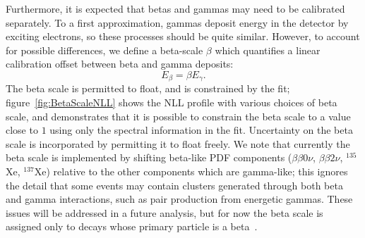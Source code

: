 Furthermore, it is expected that betas and gammas may need to be calibrated separately.  To a first approximation, gammas deposit energy in the detector by exciting electrons, so these processes should be quite similar.  However, to account for possible differences, we define a beta-scale $\beta$ which quantifies a linear calibration offset between beta and gamma deposits:
\begin{equation}
E_\beta = \beta E_\gamma.
\end{equation}
The beta scale is permitted to float, and is constrained by the fit; figure~\ref{fig:BetaScaleNLL} shows the NLL profile with various choices of beta scale, and demonstrates that it is possible to constrain the beta scale to a value close to $1$ using only the spectral information in the fit.  Uncertainty on the beta scale is incorporated by permitting it to float freely.  We note that currently the beta scale is implemented by shifting beta-like PDF components ($\beta\beta 0\nu$, $\beta\beta 2\nu$, $^{135}$Xe, $^{137}$Xe) relative to the other components which are gamma-like; this ignores the detail that some events may contain clusters generated through both beta and gamma interactions, such as pair production from energetic gammas.  These issues will be addressed in a future analysis, but for now the beta scale is assigned only to decays whose primary particle is a beta~\cite{FittingDocument}.

